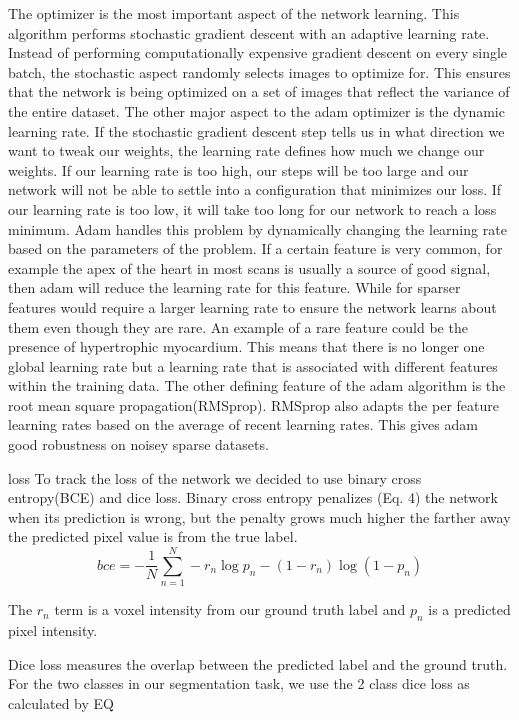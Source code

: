 \documentclass[12pt]{article}
\begin{document}
The optimizer is the most important aspect of the network learning.
This algorithm performs stochastic gradient descent with an adaptive learning rate.
Instead of performing computationally expensive gradient descent on every single batch, the stochastic aspect randomly selects images to optimize for.
This ensures that the network is being optimized on a set of images that reflect the variance of the entire dataset.
The other major aspect to the adam optimizer is the dynamic learning rate.
If the stochastic gradient descent step tells us in what direction we want to tweak our weights, the learning rate defines how much we change our weights.
If our learning rate is too high, our steps will be too large and our network will not be able to settle into a configuration that minimizes our loss.
If our learning rate is too low, it will take too long for our network to reach a loss minimum.
Adam handles this problem by dynamically changing the learning rate based on the parameters of the problem.
If a certain feature is very common, for example the apex of the heart in most scans is usually a source of good signal, then adam will reduce the learning rate for this feature.
While for sparser features would require a larger learning rate to ensure the network learns about them even though they are rare.
An example of a rare feature could be the presence of hypertrophic myocardium.
This means that there is no longer one global learning rate but a learning rate that is associated with different features within the training data.
The other defining feature of the adam algorithm is the root mean square propagation(RMSprop).
RMSprop also adapts the per feature learning rates based on the average of recent learning rates.
This gives adam good robustness on noisey sparse datasets\cite{adam_opt}.

loss
To track the loss of the network we decided to use binary cross entropy(BCE) and dice loss.
Binary cross entropy penalizes (Eq. 4) the network when its prediction is wrong, but the penalty grows much higher the farther away the predicted pixel value is from the true label.
\begin{equation}
bce = - \frac{1}{N} \sum_{n=1}^{N} -r_{n}\log p_{n} -(1-r_{n})\log(1-p_{n})
\end{equation}

The $r_{n}$ term is a voxel intensity from our ground truth label and $p_{n}$ is a predicted pixel intensity.

Dice loss measures the overlap between the predicted label and the ground truth.
For the two classes in our segmentation task, we use the 2 class dice loss as calculated by EQ %
\end{document}
